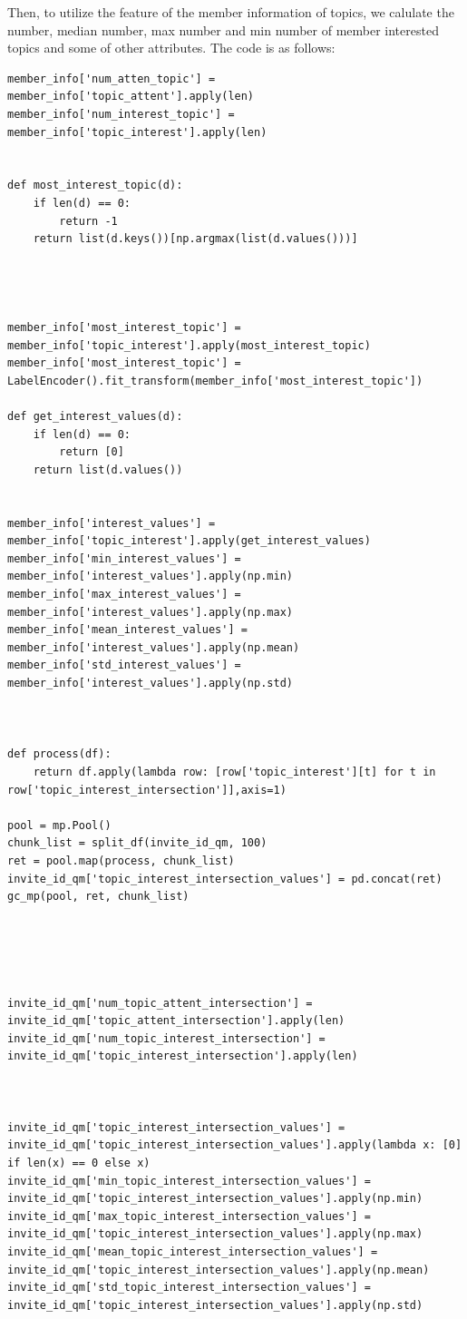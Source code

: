 \documentclass[sigconf]{acmart}
\begin{document}
Then, to utilize the feature of the member information of topics, we calulate the number, median number, max number and min number of member interested topics and some of other attributes. The code is as follows:
\begin{lstlisting}
member_info['num_atten_topic'] = member_info['topic_attent'].apply(len)
member_info['num_interest_topic'] = member_info['topic_interest'].apply(len)


def most_interest_topic(d):
    if len(d) == 0:
        return -1
    return list(d.keys())[np.argmax(list(d.values()))]




member_info['most_interest_topic'] = member_info['topic_interest'].apply(most_interest_topic)
member_info['most_interest_topic'] = LabelEncoder().fit_transform(member_info['most_interest_topic'])

def get_interest_values(d):
    if len(d) == 0:
        return [0]
    return list(d.values())


member_info['interest_values'] = member_info['topic_interest'].apply(get_interest_values)
member_info['min_interest_values'] = member_info['interest_values'].apply(np.min)
member_info['max_interest_values'] = member_info['interest_values'].apply(np.max)
member_info['mean_interest_values'] = member_info['interest_values'].apply(np.mean)
member_info['std_interest_values'] = member_info['interest_values'].apply(np.std)



def process(df):
    return df.apply(lambda row: [row['topic_interest'][t] for t in row['topic_interest_intersection']],axis=1)

pool = mp.Pool()
chunk_list = split_df(invite_id_qm, 100)
ret = pool.map(process, chunk_list)
invite_id_qm['topic_interest_intersection_values'] = pd.concat(ret)
gc_mp(pool, ret, chunk_list)





invite_id_qm['num_topic_attent_intersection'] = invite_id_qm['topic_attent_intersection'].apply(len)
invite_id_qm['num_topic_interest_intersection'] = invite_id_qm['topic_interest_intersection'].apply(len)



invite_id_qm['topic_interest_intersection_values'] = invite_id_qm['topic_interest_intersection_values'].apply(lambda x: [0] if len(x) == 0 else x)
invite_id_qm['min_topic_interest_intersection_values'] = invite_id_qm['topic_interest_intersection_values'].apply(np.min)
invite_id_qm['max_topic_interest_intersection_values'] = invite_id_qm['topic_interest_intersection_values'].apply(np.max)
invite_id_qm['mean_topic_interest_intersection_values'] = invite_id_qm['topic_interest_intersection_values'].apply(np.mean)
invite_id_qm['std_topic_interest_intersection_values'] = invite_id_qm['topic_interest_intersection_values'].apply(np.std)


\end{lstlisting}
\end{document}
